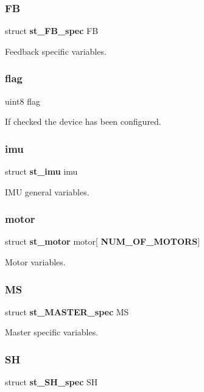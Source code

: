 \subsubsection{FB}
{\footnotesize\ttfamily struct \textbf{ st\+\_\+\+F\+B\+\_\+spec} FB}

Feedback specific variables. \mbox{\label{structst__eeprom_af11e40d15a1361229a78e772af5b3c94}} 
\subsubsection{flag}
{\footnotesize\ttfamily uint8 flag}

If checked the device has been configured. \mbox{\label{structst__eeprom_a5587b913fbf50df4c3a5148dd8aab649}} 
\subsubsection{imu}
{\footnotesize\ttfamily struct \textbf{ st\+\_\+imu} imu}

I\+MU general variables. \mbox{\label{structst__eeprom_abe01764856595b55e98fe187ae4c9b54}} 
\subsubsection{motor}
{\footnotesize\ttfamily struct \textbf{ st\+\_\+motor} motor[\textbf{ N\+U\+M\+\_\+\+O\+F\+\_\+\+M\+O\+T\+O\+RS}]}

Motor variables. \mbox{\label{structst__eeprom_ab2f591c243365039926d9b449d7fbc46}} 
\subsubsection{MS}
{\footnotesize\ttfamily struct \textbf{ st\+\_\+\+M\+A\+S\+T\+E\+R\+\_\+spec} MS}

Master specific variables. \mbox{\label{structst__eeprom_a48c2a3988657edd4d6b92f84a0d9d2d0}} 
\subsubsection{SH}
{\footnotesize\ttfamily struct \textbf{ st\+\_\+\+S\+H\+\_\+spec} SH}

